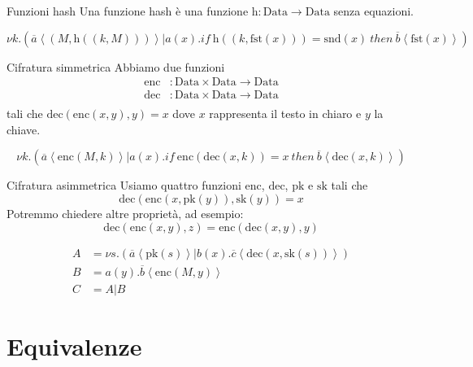 \documentclass{beamer}
\theoremstyle{plain}
\theoremstyle{definition}
\theoremstyle{remark}
\newcommand{\obar}[1]{\overline{#1}}
\newcommand{\pa}[1]{\left(#1\right)}
\newcommand{\ang}[1]{\left<#1\right>}
\begin{document}
\begin{frame}{Funzioni hash}
  Una funzione hash \`e una funzione $\mathrm{h}: \mathrm{Data}
  \rightarrow \mathrm{Data}$ senza equazioni.
  
  \[ \nu k.\pa{ \obar{a}\ang{ \pa{M,\mathrm{h}\pa{(k,M)}}} | a(x).if\
      \mathrm{h}\pa{(k,\mathrm{fst}(x))} = \mathrm{snd}(x)\ then\
      \obar{b}\ang{\mathrm{fst}(x)}} \]
\end{frame}

\begin{frame}{Cifratura simmetrica}
  Abbiamo due funzioni
  \begin{align*}
    \mathrm{enc} &: \mathrm{Data} \times \mathrm{Data} \rightarrow
                   \mathrm{Data} \\
    \mathrm{dec} &: \mathrm{Data} \times \mathrm{Data} \rightarrow
                   \mathrm{Data} \\
  \end{align*}
  tali che $\mathrm{dec}\pa{\mathrm{enc}(x,y),y} = x$ dove $x$
  rappresenta il testo in chiaro e $y$ la chiave.
  \vfill
  
  \[ \nu k. \pa{ \obar{a}\ang{\mathrm{enc}(M,k)} | a\pa{x}.if\
      \mathrm{enc}\pa{ \mathrm{dec}(x,k)} = x\ then\
      \obar{b}\ang{\mathrm{dec}(x,k)}} \]
\end{frame}

\begin{frame}{Cifratura asimmetrica}
  Usiamo quattro funzioni $\mathrm{enc}$, $\mathrm{dec}$,
  $\mathrm{pk}$ e $\mathrm{sk}$ tali che
  \[ \mathrm{dec}\pa{\mathrm{enc}\pa{x,\mathrm{pk}(y)},\mathrm{sk}(y)}
    = x \]
  Potremmo chiedere altre propriet\`a, ad esempio:
  \[ \mathrm{dec}\pa{\mathrm{enc}(x,y),z} =
    \mathrm{enc}\pa{\mathrm{dec}(x,y),y} \]
  \vfill

  \begin{align*}
    A &= \nu s.\pa{ \obar{a}\ang{\mathrm{pk}(s)}|
    b(x).\obar{c}\ang{\mathrm{dec}\pa{ x,\mathrm{sk}(s) } } } \\
    B &= a(y).\obar{b}\ang{\mathrm{enc}(M,y)} \\
    C &= A|B   
  \end{align*}
\end{frame}

\section{Equivalenze}
\end{document}
